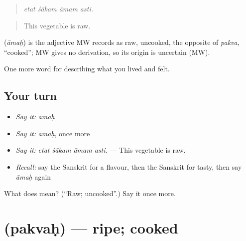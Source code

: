 \begin{quote}
   
\end{quote}

\begin{quote}
\emph{etat śākam āmam asti.}
\end{quote}

\begin{quote}
This vegetable is raw.
\end{quote}

\begin{cousinweb}
\textbf{} (\emph{āmaḥ}) is the adjective MW records as raw, uncooked, the opposite of \emph{pakva}, \textquotedblleft{}cooked\textquotedblright{}; MW gives no derivation, so its origin is uncertain (MW).
\end{cousinweb}

\begin{grammarlens}[title={What you've built}]
One more word for describing what you lived and felt.
\end{grammarlens}

\subsection*{Your turn}
\begin{itemize}
\raggedright
  \item \emph{Say it:} \emph{āmaḥ}
  \item \emph{Say it:} \emph{āmaḥ}, once more
  \item \emph{Say it:} \emph{etat śākam āmam asti.} — This vegetable is raw.
  \item \emph{Recall:} say the Sanskrit for a flavour, then the Sanskrit for tasty, then say \emph{āmaḥ} again
\end{itemize}

\begin{tcolorbox}[breakable,colback=teal!4,colframe=teal!35!black,title={Before you move on}]
What does  mean? (\textquotedblleft{}Raw; uncooked\textquotedblright{}.) Say it once more.
\end{tcolorbox}
\section[\texorpdfstring{\sk{पक्वः} (pakvaḥ)}{पक्वः (pakvaḥ)}]{ (pakvaḥ) — ripe; cooked}

\label{lesson:SA-C515-pakvah}



